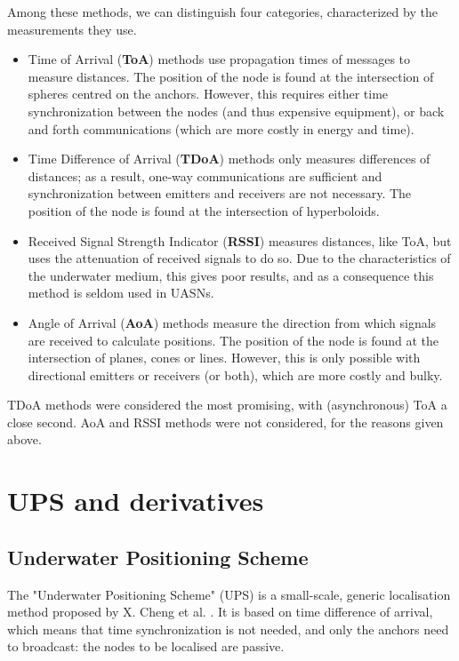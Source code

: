 \documentclass[12pt,a4paper,fleqn]{report}
\begin{document}
Among these methods, we can distinguish four categories, characterized by the measurements they use.
\begin{itemize}
	\itemsep0em
	\item Time of Arrival (\textbf{ToA}) methods use propagation times of messages to measure distances. The position of the node is found at the intersection of spheres centred on the anchors. However, this requires either time synchronization between the nodes (and thus expensive equipment), or back and forth communications (which are more costly in energy and time).
	\item Time Difference of Arrival (\textbf{TDoA}) methods only measures differences of distances; as a result, one-way communications are sufficient and synchronization between emitters and receivers are not necessary. The position of the node is found at the intersection of hyperboloids.
	\item Received Signal Strength Indicator (\textbf{RSSI}) measures distances, like ToA, but uses the attenuation of received signals to do so. Due to the characteristics of the underwater medium, this gives poor results, and as a consequence this method is seldom used in UASNs.
	\item Angle of Arrival (\textbf{AoA}) methods measure the direction from which signals are received to calculate positions. The position of the node is found at the intersection of planes, cones or lines. However, this is only possible with directional emitters or receivers (or both), which are more costly and bulky.
\end{itemize}
TDoA methods were considered the most promising, with (asynchronous) ToA a close second. AoA and RSSI methods were not considered, for the reasons given above.

\section{UPS and derivatives}

\subsection{Underwater Positioning Scheme}

The "Underwater Positioning Scheme" (UPS) is a small-scale, generic localisation method proposed by X. Cheng et al. \cite{ups}. It is based on time difference of arrival, which means that time synchronization is not needed, and only the anchors need to broadcast: the nodes to be localised are passive.
\end{document}
